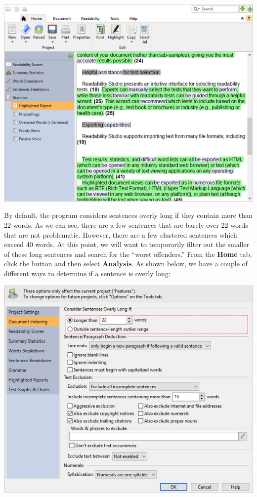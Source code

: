 \documentclass[
]{book}
\theoremstyle{definition}
\theoremstyle{definition}
\theoremstyle{definition}
\theoremstyle{definition}
\theoremstyle{remark}
\begin{document}
\includegraphics{Images/featuressentences.png}

By default, the program considers sentences overly long if they contain more than 22 words. As we can see, there are a few sentences that are barely over 22 words that are not problematic. However, there are a few clustered sentences which exceed 40 words. At this point, we will want to temporarily filter out the smaller of these long sentences and search for the ``worst offenders.'' From the \textbf{Home} tab, click the  button and then select \textbf{Analysis}. As shown below, we have a couple of different ways to determine if a sentence is overly long:

\includegraphics{Images/featuressentoptions.png}
\end{document}
